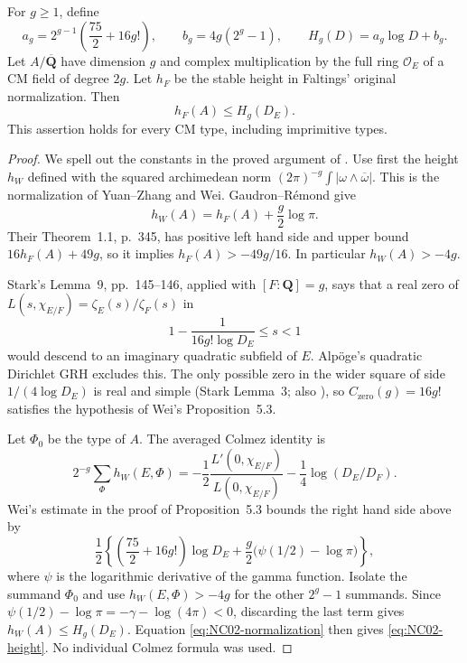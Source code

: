 \begin{theorem}
\label{NC02}
For $g\geq1$, define
\[
 a_g=2^{g-1}\left(\frac{75}{2}+16g!\right),
 \qquad b_g=4g(2^g-1),\qquad H_g(D)=a_g\log D+b_g.
\]
Let $A/\overline{\mathbf Q}$ have dimension $g$ and complex
multiplication by the full ring $\mathcal O_E$ of a CM field of degree
$2g$.  Let $h_F$ be the stable height in Faltings' original normalization.
Then
\begin{equation}\label{eq:NC02-height}
 h_F(A)\leq H_g(D_E).
\end{equation}
This assertion holds for every CM type, including imprimitive types.
\end{theorem}

\begin{proof}
We spell out the constants in the proved argument of
\cite[Proposition~5.3 and its proof, pp.~19--20]{NC-Wei2021}.
Use first the height $h_W$ defined with the squared archimedean norm
$(2\pi)^{-g}\int|\omega\wedge\overline\omega|$.
This is the normalization of Yuan--Zhang
\cite[\S1.1, p.~534; Theorem~1.1, p.~535]{NC-YuanZhang2018}
and Wei.  Gaudron--R\'emond
\cite[\S2.3, pp.~351--352]{NC-GRPeriods2014} give
\begin{equation}\label{eq:NC02-normalization}
 h_W(A)=h_F(A)+\frac g2\log\pi.
\end{equation}
Their Theorem~1.1, p.~345, has positive left hand side and upper bound
$16h_F(A)+49g$, so it implies $h_F(A)>-49g/16$.
In particular $h_W(A)>-4g$.

Stark's Lemma~9, pp.~145--146, applied with $[F:\mathbf Q]=g$, says
that a real zero of $L(s,\chi_{E/F})=\zeta_E(s)/\zeta_F(s)$ in
\[
 1-\frac{1}{16g!\log D_E}\leq s<1
\]
would descend to an imaginary quadratic subfield of $E$.
Alp\"oge's quadratic Dirichlet GRH excludes this.  The only possible
zero in the wider square of side $1/(4\log D_E)$ is real and simple
(Stark Lemma~3; also \cite[\S1, p.~3]{NC-Wei2021}), so
$C_{\mathrm{zero}}(g)=16g!$ satisfies the hypothesis of Wei's
Proposition~5.3.

Let $\Phi_0$ be the type of $A$.  The averaged Colmez identity is
\[
 2^{-g}\sum_\Phi h_W(E,\Phi)=
 -\frac12\frac{L'(0,\chi_{E/F})}{L(0,\chi_{E/F})}
 -\frac14\log(D_E/D_F).
\]
Wei's estimate in the proof of Proposition~5.3 bounds the right hand
side above by
\[
 \frac12\left\{
 \left(\frac{75}{2}+16g!\right)\log D_E
 +\frac g2\bigl(\psi(1/2)-\log\pi\bigr)\right\},
\]
where $\psi$ is the logarithmic derivative of the gamma function.
Isolate the summand $\Phi_0$ and use $h_W(E,\Phi)>-4g$ for the
other $2^g-1$ summands.  Since
$\psi(1/2)-\log\pi=-\gamma-\log(4\pi)<0$, discarding the last
term gives $h_W(A)\leq H_g(D_E)$.
Equation \eqref{eq:NC02-normalization} then gives
\eqref{eq:NC02-height}.  No individual Colmez formula was used.
\end{proof}

